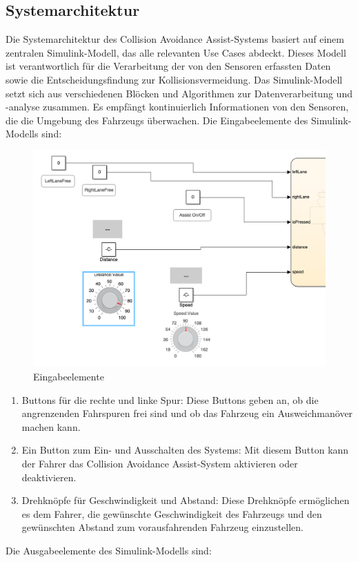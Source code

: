 \subsection{Systemarchitektur}
Die Systemarchitektur des Collision Avoidance Assist-Systems basiert auf einem zentralen Simulink-Modell, das alle relevanten Use Cases abdeckt. Dieses Modell ist verantwortlich für die Verarbeitung der von den Sensoren erfassten Daten sowie die Entscheidungsfindung zur Kollisionsvermeidung. Das Simulink-Modell setzt sich aus verschiedenen Blöcken und Algorithmen zur Datenverarbeitung und -analyse zusammen. Es empfängt kontinuierlich Informationen von den Sensoren, die die Umgebung des Fahrzeugs überwachen. \newline
Die Eingabeelemente des Simulink-Modells sind:
\begin{figure}[H]
	\centering	
	\includegraphics[width=.8\textwidth]{img/eingabeelemente}
	\caption[Eingabeelemente]{Eingabeelemente}
	\label{fig:Eingabeelemente des Simulink-Modells}
\end{figure}
\begin{enumerate}
	\item Buttons für die rechte und linke Spur: Diese Buttons geben an, ob die angrenzenden Fahrspuren frei sind und ob das Fahrzeug ein Ausweichmanöver machen kann.
	\item Ein Button zum Ein- und Ausschalten des Systems: Mit diesem Button kann der Fahrer das Collision Avoidance Assist-System aktivieren oder deaktivieren.
	\item Drehknöpfe für Geschwindigkeit und Abstand: Diese Drehknöpfe ermöglichen es dem Fahrer, die gewünschte Geschwindigkeit des Fahrzeugs und den gewünschten Abstand zum vorausfahrenden Fahrzeug einzustellen.
\end{enumerate}
Die Ausgabeelemente des Simulink-Modells sind:
